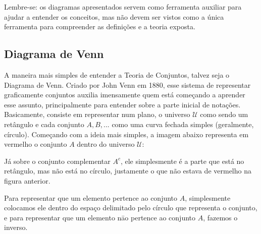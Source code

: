     Lembre-se: os diagramas apresentados servem como ferramenta auxiliar para ajudar a entender os conceitos, mas não devem ser vistos como a única ferramenta para compreender as definições e  a teoria exposta.
    
    \newpage
    \subsection{Diagrama de Venn}
    A maneira mais simples de entender a Teoria de Conjuntos, talvez seja o Diagrama de Venn. Criado por John Venn em 1880, esse sistema de representar graficamente conjuntos auxilia imensamente quem está começando a aprender esse assunto, principalmente para entender sobre a parte inicial de notações. Basicamente, consiste em representar num plano, o universo $\mathcal U$ como sendo um retângulo e cada conjunto $A,B,...$ como uma curva fechada simples (geralmente, círculo). Começando com a ideia mais simples, a imagem abaixo representa em vermelho o conjunto $A$ dentro do universo $\mathcal U$:
    
    
    Já sobre o conjunto complementar $A^c$, ele simplesmente é a parte que está no retângulo, mas não está no círculo, justamente o que não estava de vermelho na figura anterior.
    
    
    Para representar que um elemento pertence ao conjunto $A$, simplesmente colocamos ele dentro do espaço delimitado pelo círculo que representa o conjunto, e para representar que um elemento nāo pertence ao conjunto $A$, fazemos o inverso.
    
    
    
